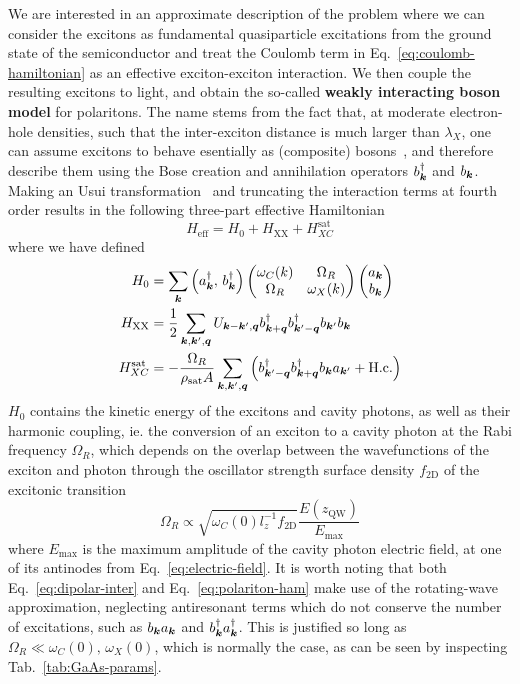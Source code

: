 We are interested in an approximate description of the problem where
we can consider the excitons as fundamental quasiparticle excitations
from the ground state of the semiconductor and treat the Coulomb term
in Eq.~\eqref{eq:coulomb-hamiltonian} as an effective exciton-exciton
interaction. We then couple the resulting excitons to light, and
obtain the so-called \textbf{weakly interacting boson model} for
polaritons. The name stems from the fact that, at moderate
electron-hole densities, such that the inter-exciton distance is much
larger than $\lambda_X$, one can assume excitons to behave esentially
as (composite) bosons~\cite{deveaud2003electron}, and therefore
describe them using the Bose creation and annihilation operators
$b_{\bm{k}}^{\dagger}$ and $b_{\bm{k}}$. Making an Usui
transformation~\cite{Usui1960} and truncating the interaction terms at
fourth order results in the following three-part effective
Hamiltonian~\cite{Ciuti_2003}
%
\begin{equation}\label{eq:total-ham}
  H_{\text{eff}} = H_0  + H_{\text{XX}} + H_{XC}^{\text{sat}}
\end{equation}
% 
where we have defined
\begin{align}
  H_0 & =\sum_{\bm{k}}\left(a_{\bm{k}}^{\dagger},\, b_{\bm{k}}^{\dagger}\right)\begin{pmatrix} \omega_C(k) & \Omega_R\\ \Omega_R & \omega_X(k) \end{pmatrix}\begin{pmatrix} a_{\bm{k}}\\ b_{\bm{k}} \end{pmatrix}\label{eq:polariton-ham}\\
  H_{\text{XX}} & =\frac{1}{2}\sum_{\bm{k},\bm{k}^{\prime},\bm{q}}U_{\bm{k} - \bm{k}^{\prime},\bm{q}}b_{\bm{k} + \bm{q}}^{\dagger}b_{\bm{k}^{\prime} - \bm{q}}^{\dagger}b_{\bm{k}^{\prime}}b_{\bm{k}}\label{eq:interaction-ham}\\
  H_{XC}^{\text{sat}} & =-\frac{\Omega_R}{\rho_{\text{sat}}A}\sum_{\bm{k},\bm{k}^{\prime},\bm{q}}\left(b_{\bm{k}^{\prime}-\bm{q}}^{\dagger}b_{\bm{k} + \bm{q}}^{\dagger}b_{\bm{k}}a_{\bm{k}^{\prime}} + \text{H.c.}\right)\label{eq:saturation-ham}
\end{align}
$H_0$ contains the kinetic energy of the excitons and cavity photons,
as well as their harmonic coupling, ie. the conversion of an exciton
to a cavity photon at the Rabi frequency $\Omega_R$, which depends on
the overlap between the wavefunctions of the exciton and photon
through the  oscillator strength surface density $f_{\text{2D}}$ of
the excitonic transition
%
\begin{equation}\label{eq:omega-R}
  \Omega_R \propto \sqrt{\omega_C(0)l_z^{-1}f_{\text{2D}}} \frac{E(z_{\text{QW}})}{E_{\text{max}}}
\end{equation}
% 
where $E_{\text{max}}$ is the maximum amplitude of the cavity photon
electric field, at one of its antinodes from
Eq.~\eqref{eq:electric-field}. It is worth noting that both
Eq.~\eqref{eq:dipolar-inter} and Eq.~\eqref{eq:polariton-ham} make use
of the rotating-wave approximation, neglecting antiresonant terms
which do not conserve the number of excitations, such as
$b_{\bm{k}}a_{\bm{k}}$ and $b_{\bm{k}}^{\dagger}a_{\bm{k}}^{\dagger}$. This is
justified so long as $\Omega_R \ll \omega_C(0),\, \omega_X(0)$, which
is normally the case, as can be seen by inspecting
Tab.~\ref{tab:GaAs-params}.

